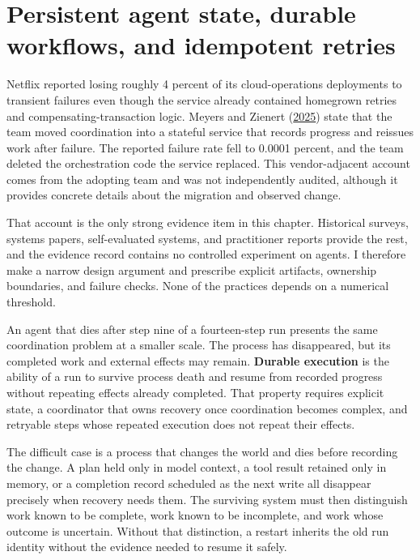\chapter{Persistent agent state, durable workflows, and idempotent retries}
\label{ch08-persistent-state-durable-workflows-idempotent-retries}
Netflix reported losing roughly 4 percent of its cloud-operations deployments to transient failures even though the service already contained homegrown retries and compensating-transaction logic. Meyers and Zienert (\href{https://netflixtechblog.com/how-temporal-powers-reliable-cloud-operations-at-netflix-73c69ccb5953}{2025}) state that the team moved coordination into a stateful service that records progress and reissues work after failure. The reported failure rate fell to 0.0001 percent, and the team deleted the orchestration code the service replaced. This vendor-adjacent account comes from the adopting team and was not independently audited, although it provides concrete details about the migration and observed change.

That account is the only strong evidence item in this chapter. Historical surveys, systems papers, self-evaluated systems, and practitioner reports provide the rest, and the evidence record contains no controlled experiment on agents. I therefore make a narrow design argument and prescribe explicit artifacts, ownership boundaries, and failure checks. None of the practices depends on a numerical threshold.

An agent that dies after step nine of a fourteen-step run presents the same coordination problem at a smaller scale. The process has disappeared, but its completed work and external effects may remain. \textbf{Durable execution} is the ability of a run to survive process death and resume from recorded progress without repeating effects already completed. That property requires explicit state, a coordinator that owns recovery once coordination becomes complex, and retryable steps whose repeated execution does not repeat their effects.

The difficult case is a process that changes the world and dies before recording the change. A plan held only in model context, a tool result retained only in memory, or a completion record scheduled as the next write all disappear precisely when recovery needs them. The surviving system must then distinguish work known to be complete, work known to be incomplete, and work whose outcome is uncertain. Without that distinction, a restart inherits the old run identity without the evidence needed to resume it safely.

